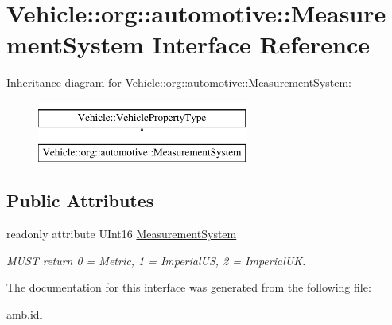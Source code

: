 \hypertarget{interfaceVehicle_1_1org_1_1automotive_1_1MeasurementSystem}{\section{Vehicle\-:\-:org\-:\-:automotive\-:\-:Measurement\-System Interface Reference}
\label{interfaceVehicle_1_1org_1_1automotive_1_1MeasurementSystem}
}
Inheritance diagram for Vehicle\-:\-:org\-:\-:automotive\-:\-:Measurement\-System\-:\begin{figure}[H]
\begin{center}
\leavevmode
\includegraphics[height=2.000000cm]{interfaceVehicle_1_1org_1_1automotive_1_1MeasurementSystem}
\end{center}
\end{figure}
\subsection*{Public Attributes}
\begin{DoxyCompactItemize}
\item 
\hypertarget{interfaceVehicle_1_1org_1_1automotive_1_1MeasurementSystem_ae1b44196111c1d15b6bfef5901bdd7a5}{readonly attribute U\-Int16 \hyperlink{interfaceVehicle_1_1org_1_1automotive_1_1MeasurementSystem_ae1b44196111c1d15b6bfef5901bdd7a5}{Measurement\-System}}\label{interfaceVehicle_1_1org_1_1automotive_1_1MeasurementSystem_ae1b44196111c1d15b6bfef5901bdd7a5}

\begin{DoxyCompactList}\small\item\em M\-U\-S\-T return 0 = Metric, 1 = Imperial\-U\-S, 2 = Imperial\-U\-K. \end{DoxyCompactList}\end{DoxyCompactItemize}


The documentation for this interface was generated from the following file\-:\begin{DoxyCompactItemize}
\item 
amb.\-idl\end{DoxyCompactItemize}
